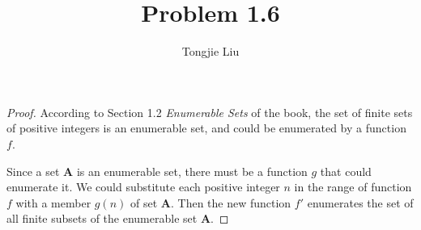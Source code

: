 \documentclass{article}
\title{Problem 1.6}
\author{Tongjie Liu}
\begin{document}
\maketitle


\begin{proof}
	According to Section 1.2 \textit{Enumerable Sets} of the book,
the set of finite sets of positive integers is an enumerable set, and
could be enumerated by a function $f$.

	Since a set $\mathbf{A}$ is an enumerable set, there must be a
function $g$ that could enumerate it. We could substitute each positive
integer $n$ in the range of function $f$ with a member $g(n)$ of set
$\mathbf{A}$. Then the new function $f'$ enumerates the set of all finite
subsets of the enumerable set $\mathbf{A}$.
\end{proof}
\end{document}
